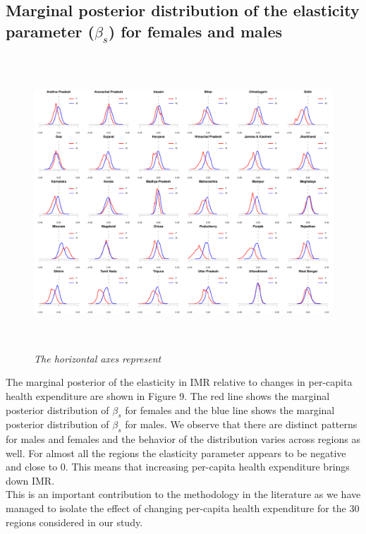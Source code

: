 \documentclass{article}
\begin{document}
\subsection{Marginal posterior distribution of the elasticity parameter ($\beta_s$) for females and males}
\begin{figure}[H]
   \begin{center}
   \includegraphics[height = 11cm, width = 15cm]{mar_post.pdf}
   \end{center}
   \caption{\emph{The horizontal axes represent }}
\end{figure}

The marginal posterior of the elasticity in IMR relative to changes in per-capita health expenditure are shown in Figure 9. The red line shows the marginal posterior distribution of $\beta_s$ for females and the blue line shows the marginal posterior distribution of $\beta_s$ for males. We observe that there are distinct patterns for males and females and the behavior of the distribution varies across regions as well. For almost all the regions the elasticity parameter appears to be negative and close to 0. This means that increasing per-capita health expenditure brings down IMR.\\
 This is an important contribution to the methodology in the literature as we have managed to isolate the effect of changing per-capita health expenditure for the 30 regions considered in our study.




\end{document}

